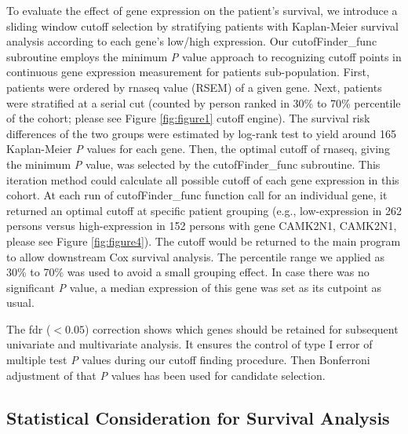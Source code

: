 \documentclass[jpm,article,submit,moreauthors,pdftex]{Definitions/mdpi}
\newenvironment{MyColorPar}[1]{%
    \leavevmode\color{#1}\ignorespaces%
}{%
}%
\begin{document}
\begin{paracol}{2}
To evaluate the effect of gene expression on the patient's survival, we introduce a sliding window cutoff selection by stratifying patients with Kaplan-Meier survival analysis according to each gene's low/high expression.
Our cutofFinder\_func subroutine employs the minimum \textit{P} value approach to recognizing cutoff points in continuous gene expression measurement for patients sub-population.
First, patients were ordered by \acrshort{rnaseq} value (RSEM) of a given gene. Next, patients were stratified at a serial cut (counted by person ranked in 30\% to 70\% percentile of the cohort; please see Figure \ref{fig:figure1} cutoff engine). The survival risk differences of the two groups were estimated by log-rank test to yield around 165 Kaplan-Meier \textit{P} values for each gene.
Then, the optimal cutoff of \acrshort{rnaseq}, giving the minimum \textit{P} value, was selected by the cutofFinder\_func subroutine.
This iteration method could calculate all possible cutoff of each gene expression in this cohort. At each run of cutofFinder\_func function call for an individual gene, it returned an optimal cutoff at specific patient grouping  (e.g., low-expression in 262 persons versus high-expression in 152 persons with gene \acrlong{CAMK2N1}, \acrshort{CAMK2N1}, please see Figure \ref{fig:figure4}). The cutoff would be returned to the main program to allow downstream Cox survival analysis. The percentile range we applied as 30\% to 70\% was used to avoid a small grouping effect\cite{Miller1982}\cite{Mizuno2009a}.
In case there was no significant \textit{P} value, a median expression of this gene was set as its cutpoint as usual.
\begin{MyColorPar}{red}
The \acrfull{fdr} ($< 0.05$) correction\cite{Benjamini1995a} shows which genes should be retained for subsequent univariate and multivariate analysis.
It ensures the control of type I error of multiple test \textit{P} values during our cutoff finding procedure.
Then Bonferroni adjustment of that \textit{P} values has been used for candidate selection.
\end{MyColorPar} %

\subsection{Statistical Consideration for Survival Analysis}


\end{paracol}
\end{document}

